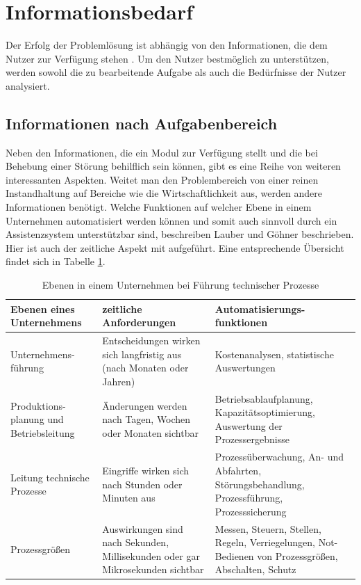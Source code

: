 
\section{Informationsbedarf}
Der Erfolg der Problemlösung ist abhängig von den Informationen, die dem Nutzer zur Verfügung stehen \cite{Funke2015}. Um den Nutzer bestmöglich zu unterstützen, werden sowohl die zu bearbeitende Aufgabe als auch die Bedürfnisse der Nutzer analysiert.

\subsection{Informationen nach Aufgabenbereich}
Neben den Informationen, die ein Modul zur Verfügung stellt und die bei Behebung einer Störung behilflich sein können, gibt es eine Reihe von weiteren interessanten Aspekten. Weitet man den Problembereich von einer reinen Instandhaltung auf Bereiche wie die Wirtschaftlichkeit aus, werden andere Informationen benötigt. Welche Funktionen auf welcher Ebene in einem Unternehmen automatisiert werden können und somit auch sinnvoll durch ein Assistenzsystem unterstützbar sind, beschreiben Lauber und Göhner \cite{Lauber1999}  beschrieben. Hier ist auch der zeitliche Aspekt mit aufgeführt. Eine entsprechende Übersicht findet sich in Tabelle \ref{tab:Ebenen-Unternehmen}.
\begin{table}[htb]
\centering
\caption[Ebenen in einem Unternehmen bei Führung technischer Prozesse]{Ebenen in einem Unternehmen bei Führung technischer Prozesse \citep{Lauber1999}}
\label{tab:Ebenen-Unternehmen}
\begin{tabular}{|p{}|p{}|p{}|}
\hline
\textbf{Ebenen eines Unternehmens} & \textbf{zeitliche Anforderungen} & \textbf{Automatisierungs-funktionen} \\
\hline
Unternehmens-führung & Entscheidungen wirken sich langfristig aus (nach Monaten oder Jahren) & Kostenanalysen, statistische Auswertungen \\
\hline
Produktions-planung und Betriebsleitung & Änderungen werden nach Tagen, Wochen oder Monaten sichtbar & Betriebsablaufplanung, Kapazitätsoptimierung, Auswertung der Prozessergebnisse \\
\hline
Leitung technische Prozesse & Eingriffe wirken sich nach Stunden oder Minuten aus & Prozessüberwachung, An- und Abfahrten, Störungsbehandlung, Prozessführung, Prozesssicherung \\
\hline
Prozessgrößen & Auswirkungen sind nach Sekunden, Millisekunden oder gar Mikrosekunden sichtbar & Messen, Steuern, Stellen, Regeln, Verriegelungen, Not-Bedienen von Prozessgrößen, Abschalten, Schutz \\
\hline
\end{tabular}
\end{table}

